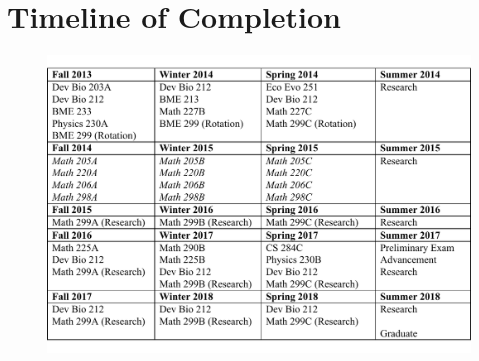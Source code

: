 \chapter{Timeline of Completion}

\begin{figure}
   \begin{center}
   \captionsetup{width=13cm}
	\includegraphics*[width=13cm]{timeline.pdf}
      \caption{}
      \label{fig::timeline}
   \end{center}
\end{figure}